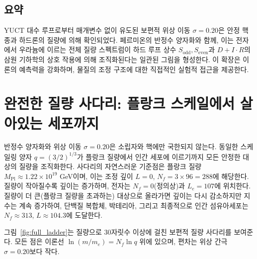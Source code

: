 \documentclass[12pt,a4paper]{article}
\begin{document}
	\subsection{요약}
	
	YUCT 대수 루프로부터 매개변수 없이 유도된 보편적 위상 이동 \(\sigma = 0.20\)은 안정 핵종과 하드론의 질량에 의해 확인되었다. 페르미온의 반정수 양자화와 함께, 이는 전자에서 우라늄에 이르는 전체 질량 스펙트럼이 하드 루프 상수 \(S_{\mathrm{odd}}, S_{\mathrm{even}}\)과 \(D+I\cdot R\)의 삼원 기하학의 상호 작용에 의해 조직화된다는 일관된 그림을 형성한다. 이 확장은 이론의 예측력을 강화하며, 물질의 조정 구조에 대한 직접적인 실험적 접근을 제공한다.
	
	\section{완전한 질량 사다리: 플랑크 스케일에서 살아있는 세포까지}
	\label{sec:complete_ladder}
	
	반정수 양자화와 위상 이동 \(\sigma = 0.20\)은 소립자와 핵에만 국한되지 않는다. 동일한 스케일링 양자 \(q = (3/2)^{1/3}\)가 플랑크 질량에서 인간 세포에 이르기까지 모든 안정한 대상의 질량을 조직화한다. 사다리의 자연스러운 기준점은 플랑크 질량 \(M_{\mathrm{Pl}} \approx 1.22 \times 10^{19}\) GeV이며, 이는 조정 깊이 \(L = 0\), \(N_f = 3 \times 96 = 288\)에 해당한다. 질량이 작아질수록 깊이는 증가하며, 전자는 \(N_f = 0\)(정의상)과 \(L_e = 107\)에 위치한다. 질량이 더 큰(플랑크 질량을 초과하는) 대상으로 올라가면 깊이는 다시 감소하지만 지수는 계속 증가하여, 단백질 복합체, 박테리아, 그리고 최종적으로 인간 섬유아세포는 \(N_f \approx 313\), \(L \approx 104.3\)에 도달한다.
	
	그림~\ref{fig:full_ladder}는 질량으로 30자릿수 이상에 걸친 보편적 질량 사다리를 보여준다. 모든 점은 이론선 \(\ln(m/m_e) = N_f \ln q\) 위에 있으며, 편차는 위상 간극 \(\sigma = 0.20\)보다 작다.
	
\end{document}
